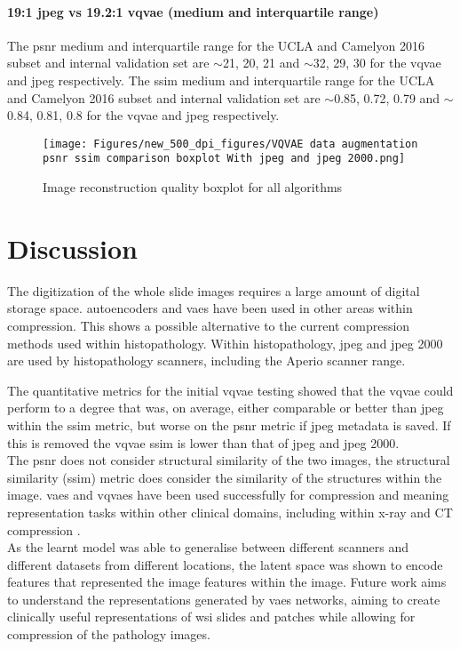 \documentclass[review]{elsarticle}
\begin{document}
\paragraph{19:1 \gls{jpeg} vs 19.2:1 \gls{vqvae} (medium and interquartile range)} The \gls{psnr} medium and interquartile range for the UCLA and Camelyon 2016 subset and internal validation set are $\sim$21, 20, 21 and $\sim$32, 29, 30 for the \gls{vqvae} and \gls{jpeg} respectively.
The \gls{ssim} medium and interquartile range for the UCLA and Camelyon 2016 subset and internal validation set are $\sim$0.85, 0.72, 0.79 and $\sim$0.84, 0.81, 0.8 for the \gls{vqvae} and \gls{jpeg} respectively.

\begin{figure}
\texttt{[image: Figures/new\_500\_dpi\_figures/VQVAE data augmentation psnr ssim comparison boxplot With jpeg and jpeg 2000.png]}
\caption{Image reconstruction quality boxplot for all algorithms}
\label{fig:image_reconstruction_quality_boxplot_for_all_algorithms}
\end{figure}

\section{Discussion}
The digitization of the whole slide images requires a large amount of digital storage space. \glspl{autoencoder} and \glspl{vae} have been used in other areas within compression. This shows a possible alternative to the current compression methods used within histopathology. Within histopathology, \gls{jpeg} and \gls{jpeg} 2000 are used by histopathology scanners, including the Aperio scanner range.


The quantitative metrics for the initial \gls{vqvae} testing showed that the \gls{vqvae} could perform to a degree that was, on average, either comparable or better than \gls{jpeg} within the \gls{ssim} metric, but worse on the \gls{psnr} metric if \gls{jpeg} metadata is saved. If this is removed the \gls{vqvae} \gls{ssim} is lower than that of \gls{jpeg} and \gls{jpeg} 2000. \\
The \gls{psnr} does not consider structural similarity of the two images, the structural similarity (\gls{ssim}) metric does consider the similarity of the structures within the image. 
\glspl{vae} and \glspl{vqvae} have been used successfully for compression and meaning representation tasks within other clinical domains, including within x-ray and CT compression \cite{kwon_appropriate_2020}. \\
As the learnt model was able to generalise between different scanners and different datasets from different locations, the latent space was shown to encode features that represented the image features within the image. Future work aims to understand the representations generated by \glspl{vae} networks, aiming to create clinically useful representations of \gls{wsi} slides and patches while allowing for compression of the pathology images. 
\end{document}
